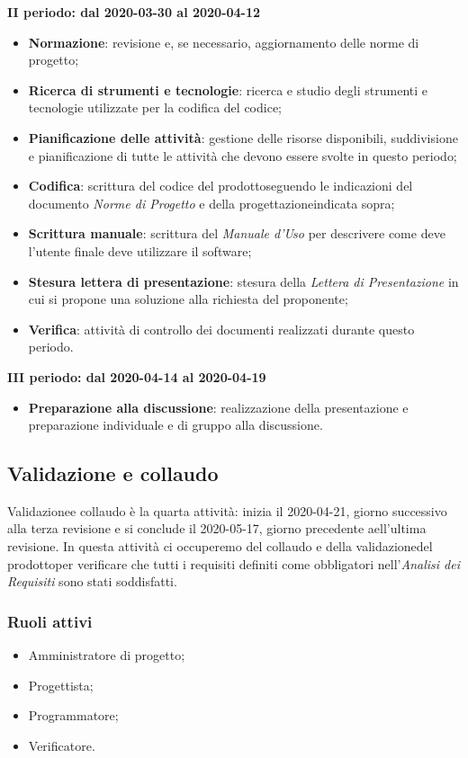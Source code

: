\textbf{II periodo: dal 2020-03-30 al 2020-04-12}
\begin{itemize}
	\item \textbf{Normazione}: revisione e, se necessario, aggiornamento delle norme di progetto\glo;
	\item \textbf{Ricerca di strumenti e tecnologie}: ricerca e studio degli strumenti e tecnologie utilizzate per la codifica del codice;
	\item \textbf{Pianificazione delle attività}: gestione delle risorse disponibili, suddivisione e pianificazione di tutte le attività che devono essere svolte in questo periodo;
	\item \textbf{Codifica}: scrittura del codice del prodotto\glosp seguendo le indicazioni del documento \textit{Norme di Progetto} e della progettazione\glosp indicata sopra;
	\item \textbf{Scrittura manuale}: scrittura del \textit{Manuale d'Uso} per descrivere come deve l'utente finale deve utilizzare il software;
	\item \textbf{Stesura lettera di presentazione}: stesura della \textit{Lettera di Presentazione} in cui si propone una soluzione alla richiesta del proponente;
	\item \textbf{Verifica}: attività di controllo dei documenti realizzati durante questo periodo.
\end{itemize}

\textbf{III periodo: dal 2020-04-14 al 2020-04-19}
\begin{itemize}
	\item \textbf{Preparazione alla discussione}: realizzazione della presentazione e preparazione individuale e di gruppo alla discussione.
\end{itemize}

\subsection{Validazione e collaudo}
Validazione\glosp e collaudo è la quarta attività: inizia il 2020-04-21, giorno successivo alla terza revisione e si conclude il 2020-05-17, giorno precedente aell'ultima revisione. In questa attività ci occuperemo del collaudo e della validazione\glosp del prodotto\glosp per verificare che tutti i requisiti definiti come obbligatori nell'\textit{Analisi dei Requisiti} sono stati soddisfatti.

\subsubsection{Ruoli attivi}
\begin{itemize}
	\item Amministratore di progetto\glo;
	\item Progettista;
	\item Programmatore;
	\item Verificatore.
\end{itemize}

